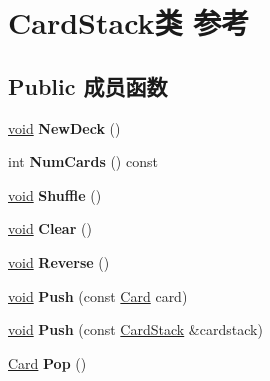 \hypertarget{class_card_stack}{}\section{Card\+Stack类 参考}
\label{class_card_stack}
\subsection*{Public 成员函数}
\begin{DoxyCompactItemize}
\item 
\mbox{\label{class_card_stack_a01d3de174380ff2413568e59654f6350}} 
\hyperlink{interfacevoid}{void} {\bfseries New\+Deck} ()
\item 
\mbox{\label{class_card_stack_a26a0e488351e9e3797d46fb4d7cfda7a}} 
int {\bfseries Num\+Cards} () const
\item 
\mbox{\label{class_card_stack_ab610042c5a4edb6943d5481f0b12f477}} 
\hyperlink{interfacevoid}{void} {\bfseries Shuffle} ()
\item 
\mbox{\label{class_card_stack_a2efa10d2eeedccdeb7b24121728a18c2}} 
\hyperlink{interfacevoid}{void} {\bfseries Clear} ()
\item 
\mbox{\label{class_card_stack_a650761a4680aa0b2c9a5866285fb8569}} 
\hyperlink{interfacevoid}{void} {\bfseries Reverse} ()
\item 
\mbox{\label{class_card_stack_a277145869a8f8f6ab9a111bd4d9d9095}} 
\hyperlink{interfacevoid}{void} {\bfseries Push} (const \hyperlink{class_card}{Card} card)
\item 
\mbox{\label{class_card_stack_ad3c5128523dab6cb22dae2a262ddb862}} 
\hyperlink{interfacevoid}{void} {\bfseries Push} (const \hyperlink{class_card_stack}{Card\+Stack} \&cardstack)
\item 
\mbox{\label{class_card_stack_ae055a61f2d52eb6590559594ce636753}} 
\hyperlink{class_card}{Card} {\bfseries Pop} ()
\item 
\mbox{\label{class_card_stack_ae06852498cb1591ffc916320fc956c1c}} 

\end{DoxyCompactItemize}
